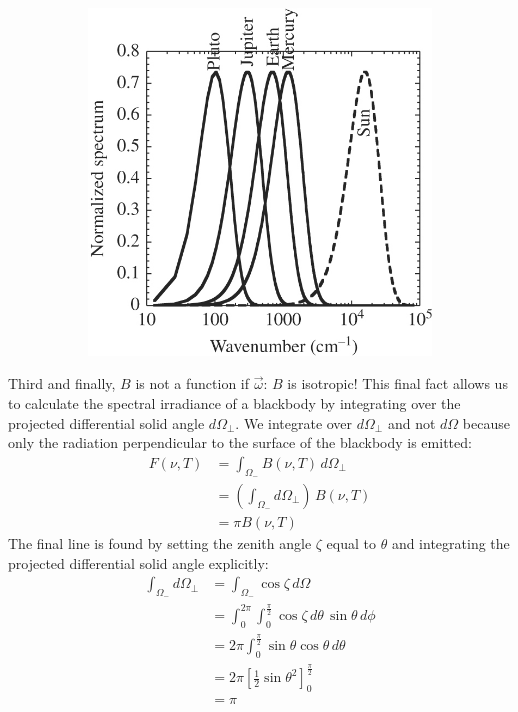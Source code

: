 \begin{figure}[H]
\begin{subfigure}{0.25\linewidth}
        \includegraphics[width=\linewidth]{Figures/Radiative Transfer/Spectral Gap.jpg}
    \end{subfigure}
\end{figure}

Third and finally, $B$ is not a function if $\vec{\omega}$: $B$ is isotropic! This final fact allows us to calculate the spectral irradiance of a blackbody by integrating over the projected differential solid angle $d\Omega_\perp$. We integrate over $d\Omega_\perp$ and not  $d\Omega$ because only the radiation perpendicular to the surface of the blackbody is emitted:
\begin{align*}
    F(\nu,T)&=\int_{\Omega_-} B(\nu,T)\,d\Omega_\perp\\
    &= \left( \int_{\Omega_-}d\Omega_{\perp} \right)\,B(\nu,T)\\
    &=\pi B(\nu,T)
\end{align*}
The final line is found by setting the zenith angle $\zeta$ equal to $\theta$ and integrating the projected differential solid angle explicitly:
\begin{align*}
    \int_{\Omega_-}d\Omega_\perp&=\int_{\Omega_-} \cos \zeta \,d\Omega\\
    &=\int_{0}^{2\pi}\int_{0}^{\frac{\pi}{2}} \cos \zeta \,d\theta \,\sin\theta \,d\phi\\
    &=2\pi \int_{0}^{\frac{\pi}{2}}\sin\theta\cos\theta\,d\theta\\
    &=2\pi\left[ \frac{1}{2}\sin\theta^2 \right]_0^{\frac{\pi}{2}}\\
    &=\pi
\end{align*}

